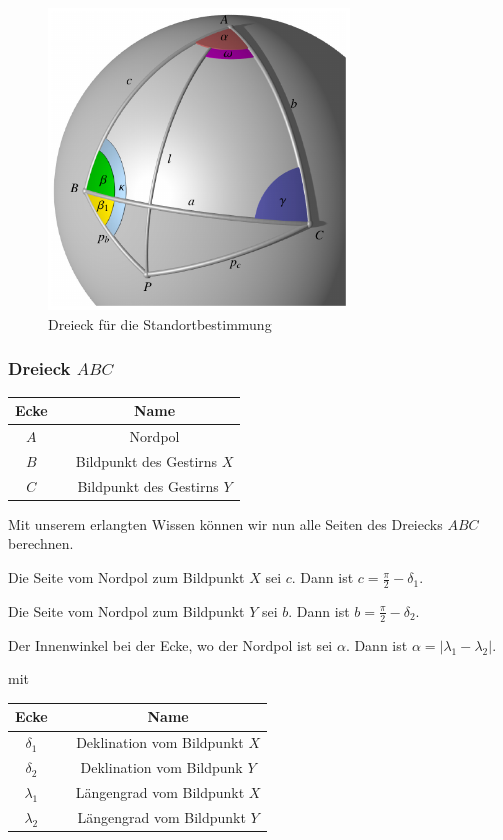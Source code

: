 \begin{figure}
	\begin{center}
		\includegraphics[width=8cm]{papers/nav/bilder/dreieck.pdf}
		\caption[Dreieck für die Standortbestimmung]{Dreieck für die Standortbestimmung}
	\end{center}
\end{figure}

\subsubsection{Dreieck $ABC$}

\begin{center}
	\begin{tabular}{ c c c }
		Ecke && Name  \\ 
		\hline
		$A$ && Nordpol \\  
		$B$ && Bildpunkt des Gestirns $X$ \\
		$C$&& Bildpunkt des Gestirns $Y$
	\end{tabular}
\end{center}

Mit unserem erlangten Wissen können wir nun alle Seiten des Dreiecks $ABC$ berechnen.

Die Seite vom Nordpol zum Bildpunkt $X$ sei $c$.
Dann ist $c = \frac{\pi}{2} - \delta_1$. 

Die Seite vom Nordpol zum Bildpunkt $Y$ sei $b$.
Dann ist $b = \frac{\pi}{2} - \delta_2$. 

Der Innenwinkel bei der Ecke, wo der Nordpol ist sei $\alpha$.
Dann ist $ \alpha = |\lambda_1 - \lambda_2|$. 

mit 
\begin{center}
	\begin{tabular}{ c c c }
		Ecke && Name  \\ 
		\hline
		$\delta_1$ && Deklination vom Bildpunkt $X$ \\  
		$\delta_2$ && Deklination vom Bildpunk $Y$ \\
		$\lambda_1 $&& Längengrad vom Bildpunkt $X$\\
		$\lambda_2$ && Längengrad vom Bildpunkt $Y$
	\end{tabular}
\end{center}

